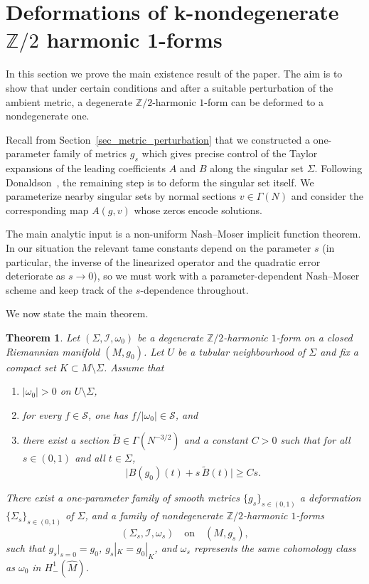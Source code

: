 \documentclass[11pt]{amsart}
\newcommand{\ZT}{\mathbb{Z}/2}
\newcommand{\Msch}{\MS}
\newcommand{\MS}{\mathcal{S}}
\newtheorem{theorem}{Theorem}[section]
\begin{document}
\section{Deformations of k-nondegenerate \texorpdfstring{$\ZT$}{Z/2} harmonic 1-forms} 
In this section we prove the main existence result of the paper. The aim is to show that under certain conditions and after a suitable perturbation of the ambient metric, a degenerate $\ZT$-harmonic $1$-form can be deformed to a nondegenerate one.

Recall from Section~\ref{sec_metric_perturbation} that we constructed a one-parameter family of metrics $g_s$ which gives precise control of the Taylor expansions of the leading coefficients $A$ and $B$ along the singular set $\Sigma$. Following Donaldson~\cite{Donaldson2021}, the remaining step is to deform the singular set itself. We parameterize nearby singular sets by normal sections $v \in \Gamma(N)$ and consider the corresponding map $A(g, v)$ whose zeros encode solutions.

The main analytic input is a non-uniform Nash--Moser implicit function theorem. In our situation the relevant tame constants depend on the parameter $s$ (in particular, the inverse of the linearized operator and the quadratic error deteriorate as $s\to 0$), so we must work with a parameter-dependent Nash--Moser scheme and keep track of the $s$-dependence throughout.

We now state the main theorem.

\begin{theorem}\label{thm:main-theorem}
	Let $(\Sigma,\mathcal{I},\omega_0)$ be a degenerate $\ZT$-harmonic $1$-form on a closed Riemannian manifold $(M,g_0)$.
	Let $U$ be a tubular neighbourhood of $\Sigma$ and fix a compact set $K\subset M\setminus \Sigma$.
	Assume that
	\begin{enumerate}[label=(\roman*)]
		\item $|\omega_0|>0$ on $U\setminus \Sigma$,
		\item for every $f\in \Msch$, one has $f/|\omega_0|\in \Msch$, and
		\item there exist a section $\widetilde B\in \Gamma(N^{-3/2})$ and a constant $C>0$ such that for all $s\in(0,1)$ and all $t\in \Sigma$,
		\[
		\bigl|B(g_0)(t)+ s\,\widetilde B(t)\bigr|\ge Cs .
		\]
	\end{enumerate}
	There exist a one-parameter family of smooth metrics $\{g_s\}_{s\in(0,1)}$ 
	a deformation $\{\Sigma_s\}_{s\in(0,1)}$ of $\Sigma$, and a family of nondegenerate $\ZT$-harmonic $1$-forms
	\[
	(\Sigma_s,\mathcal{I},\omega_s)\quad\text{on}\quad(M,g_s),
	\]
	such that $g_s|_{s=0}=g_0$, $g_s|_K=g_0|_K$, and
	$\omega_s$ represents the same cohomology class as $\omega_0$ in $H^1_-(\widehat M)$.
\end{theorem}
\end{document}
